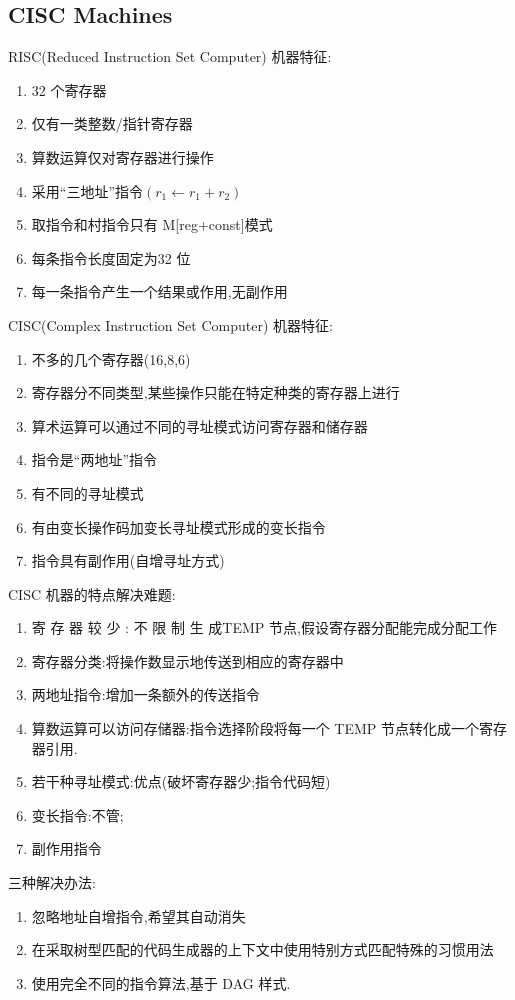 \subsection{CISC Machines}
RISC(Reduced Instruction Set Computer) 机器特征:
\begin{enumerate}
    \item 32 个寄存器
    \item 仅有一类整数/指针寄存器
    \item 算数运算仅对寄存器进行操作
    \item 采用``三地址''指令$(r_1\leftarrow r_1+r_2)$
    \item 取指令和村指令只有 M[reg+const]模式
    \item 每条指令长度固定为32 位
    \item 每一条指令产生一个结果或作用,无副作用
\end{enumerate}

CISC(Complex Instruction Set Computer) 机器特征:
\begin{enumerate}
    \item 不多的几个寄存器(16,8,6)
    \item 寄存器分不同类型,某些操作只能在特定种类的寄存器上进行
    \item 算术运算可以通过不同的寻址模式访问寄存器和储存器
    \item 指令是``两地址''指令
    \item 有不同的寻址模式
    \item 有由变长操作码加变长寻址模式形成的变长指令
    \item 指令具有副作用(自增寻址方式)
\end{enumerate}

CISC 机器的特点解决难题:
\begin{enumerate}
    \item  寄 存 器 较 少 : 不 限 制 生 成TEMP 节点,假设寄存器分配能完成分配工作
    \item 寄存器分类:将操作数显示地传送到相应的寄存器中
    \item 两地址指令:增加一条额外的传送指令
    \item 算数运算可以访问存储器:指令选择阶段将每一个 TEMP 节点转化成一个寄存器引用.
    \item 若干种寻址模式:优点(破坏寄存器少;指令代码短)
    \item 变长指令:不管;
    \item 副作用指令
\end{enumerate}

三种解决办法:
\begin{enumerate}
    \item 忽略地址自增指令,希望其自动消失
    \item 在采取树型匹配的代码生成器的上下文中使用特别方式匹配特殊的习惯用法
    \item 使用完全不同的指令算法,基于 DAG 样式.
\end{enumerate}